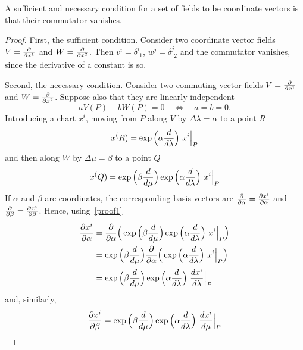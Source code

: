    A sufficient and necessary condition for a set of fields to be coordinate vectors is that their commutator vanishes. 
    \begin{proof}
    First, the sufficient condition. Consider two coordinate vector fields $V = \frac{\partial}{\partial x^1}$ and $W = \frac{\partial}{\partial x^2}$. Then $v^i = \delta^i_{\phantom i 1}$, $w^j = \delta^j_{\phantom j 2}$ and the commutator vanishes, since the derivative of a constant is so. 

    Second, the necessary condition. Consider two commuting vector fields $V = \frac{\partial}{\partial x^1}$ and $W = \frac{\partial}{\partial x^2}$. Suppose also that they are linearly independent
    \begin{equation} \label{proof2}
        a V(P) + b W(P) = 0 \quad \iff \quad a = b = 0.
    \end{equation}
    Introducing a chart $x^i$, moving from $P$ along $V$ by $\Delta \lambda = \alpha$ to a point $R$
    \begin{equation*}
        x^(R) = \exp \Big (\alpha \frac{d}{d\lambda} \Big) ~ x^i \Big\vert_P
    \end{equation*}
    and then along $W$ by $\Delta \mu = \beta$ to a point $Q$
    \begin{equation}\label{proof1}
        x^(Q) = \exp \Big (\beta \frac{d}{d\mu} \Big) \exp \Big (\alpha \frac{d}{d\lambda} \Big) ~ x^i \Big\vert_P
    \end{equation}
    If $\alpha$ and $\beta$ are coordinates, the corresponding basis vectors are $\frac{\partial}{\partial\alpha} = \frac{\partial x^i}{\partial\alpha}$ and $\frac{\partial}{\partial\beta} = \frac{\partial x^i}{\partial\beta}$.
    Hence, using~\eqref{proof1}
    \begin{equation*}
    \begin{aligned}
        \frac{\partial x^i}{\partial\alpha} & = \frac{\partial}{\partial\alpha} \Big ( \exp \Big( \beta \frac{d}{d\mu} \Big) \exp \Big( \alpha \frac{d}{d\lambda} \Big) ~ x^i \Big\vert_P \Big) \\ & = \exp \Big( \beta \frac{d}{d\mu} \Big) \frac{\partial}{\partial\alpha} \Big ( \exp \Big( \alpha \frac{d}{d\lambda} \Big) ~ x^i \Big\vert_P \Big) \\ & = \exp \Big( \beta \frac{d}{d\mu} \Big) \exp \Big( \alpha \frac{d}{d\lambda} \Big) ~ \frac{dx^i}{d\lambda} \Big\vert_P
    \end{aligned}
    \end{equation*}
    and, similarly, 
    \begin{equation*}
        \frac{\partial x^i}{\partial\beta} = \exp \Big( \beta \frac{d}{d\mu} \Big) \exp \Big( \alpha \frac{d}{d\lambda} \Big) ~ \frac{dx^i}{d\mu} \Big\vert_P
    \end{equation*}

\end{proof}

